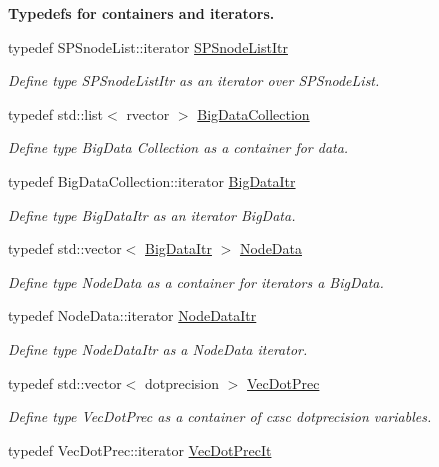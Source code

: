 \begin{Indent}{\bf \-Typedefs for containers and iterators.}
\begin{DoxyCompactItemize}
typedef \-S\-P\-Snode\-List\-::iterator \hyperlink{namespacesubpavings_a984883a654b8d040041f722f8ead7dc2}{\-S\-P\-Snode\-List\-Itr}
\begin{DoxyCompactList}\small\item\em \-Define type \-S\-P\-Snode\-List\-Itr as an iterator over \-S\-P\-Snode\-List. \end{DoxyCompactList}\item 
typedef std\-::list$<$ rvector $>$ \hyperlink{namespacesubpavings_aa79f33663da92502ce1a37f3fd1f3d85}{\-Big\-Data\-Collection}
\begin{DoxyCompactList}\small\item\em \-Define type \-Big\-Data \-Collection as a container for data. \end{DoxyCompactList}\item 
typedef \-Big\-Data\-Collection\-::iterator \hyperlink{namespacesubpavings_a8792314c11b28ac2b8c4c85c47526f3a}{\-Big\-Data\-Itr}
\begin{DoxyCompactList}\small\item\em \-Define type \-Big\-Data\-Itr as an iterator \-Big\-Data. \end{DoxyCompactList}\item 
typedef std\-::vector$<$ \hyperlink{namespacesubpavings_a8792314c11b28ac2b8c4c85c47526f3a}{\-Big\-Data\-Itr} $>$ \hyperlink{namespacesubpavings_af005697b49cff9ea37fc3bc9ed19da30}{\-Node\-Data}
\begin{DoxyCompactList}\small\item\em \-Define type \-Node\-Data as a container for iterators a \-Big\-Data. \end{DoxyCompactList}\item 
typedef \-Node\-Data\-::iterator \hyperlink{namespacesubpavings_af79bf496cfc0df4bddcbe13a62f12bff}{\-Node\-Data\-Itr}
\begin{DoxyCompactList}\small\item\em \-Define type \-Node\-Data\-Itr as a \-Node\-Data iterator. \end{DoxyCompactList}\item 
typedef std\-::vector$<$ dotprecision $>$ \hyperlink{namespacesubpavings_ad8f0a077ee1c4678bcd1868f3aecd605}{\-Vec\-Dot\-Prec}
\begin{DoxyCompactList}\small\item\em \-Define type \-Vec\-Dot\-Prec as a container of cxsc dotprecision variables. \end{DoxyCompactList}\item 
typedef \-Vec\-Dot\-Prec\-::iterator \hyperlink{namespacesubpavings_a80a828acc57552427c90b1f3119af173}{\-Vec\-Dot\-Prec\-It}

\end{DoxyCompactItemize}
\end{Indent}
